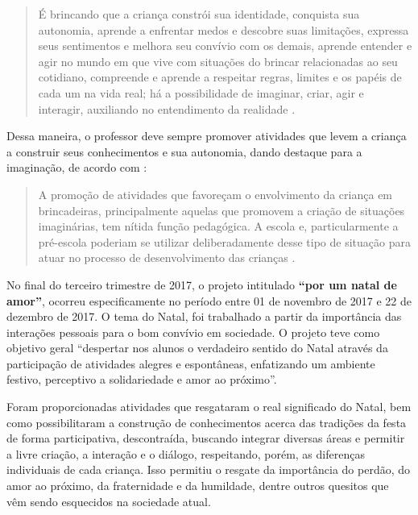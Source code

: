 \begin{refsection}
    \begin{quotation}
        É brincando que a criança constrói sua identidade, conquista sua autonomia, aprende a enfrentar medos e descobre suas limitações, expressa seus sentimentos e melhora seu convívio com os demais, aprende entender e agir no mundo em que vive com situações do brincar relacionadas ao seu cotidiano, compreende e aprende a respeitar regras, limites e os papéis de cada um na vida real; há a possibilidade de imaginar, criar, agir e interagir, auxiliando no entendimento da realidade \cite[p.~3]{MODESTOAndRUBIO2014importância}. 
    \end{quotation}

    Dessa maneira, o professor deve sempre promover atividades que levem a criança a construir seus conhecimentos e sua autonomia, dando destaque para a imaginação, de acordo com \cite{OLIVEIRA1998Vygotsky}: 

    \begin{quotation}
        A promoção de atividades que favoreçam o envolvimento da criança em brincadeiras, principalmente aquelas que promovem a criação de situações imaginárias, tem nítida função pedagógica. A escola e, particularmente a pré-escola poderiam se utilizar deliberadamente desse tipo de situação para atuar no processo de desenvolvimento das crianças \cite[p.~67]{OLIVEIRA1998Vygotsky}. 
    \end{quotation}

    No final do terceiro trimestre de 2017, o projeto intitulado \textbf{“por um natal de amor”}, ocorreu especificamente no período entre 01 de novembro de 2017 e 22 de dezembro de 2017. O tema do Natal, foi trabalhado a partir da importância das interações pessoais para o bom convívio em sociedade. O projeto teve como objetivo geral “despertar nos alunos o verdadeiro sentido do Natal através da participação de atividades alegres e espontâneas, enfatizando um ambiente festivo, perceptivo a solidariedade e amor ao próximo”. 

    Foram proporcionadas atividades que resgataram o real significado do Natal, bem como possibilitaram a construção de conhecimentos acerca das tradições da festa de forma participativa, descontraída, buscando integrar diversas áreas e permitir a livre criação, a interação e o diálogo, respeitando, porém, as diferenças individuais de cada criança. Isso permitiu o resgate da importância do perdão, do amor ao próximo, da fraternidade e da humildade, dentre outros quesitos que vêm sendo esquecidos na sociedade atual.  


\end{refsection}
